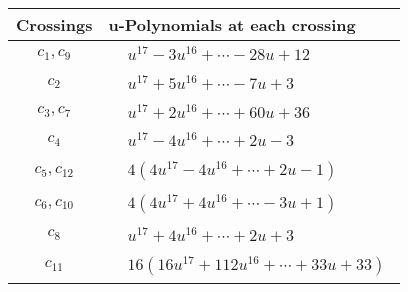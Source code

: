 \documentclass[1p]{elsarticle_modified}
\theoremstyle{definition}
\begin{document}
\begin{tabular}{m{50pt}|m{274pt}}
Crossings & \hspace{64pt}u-Polynomials at each crossing \\
\hline $$\begin{aligned}c_{1},c_{9}\end{aligned}$$&$\begin{aligned}
&u^{17}-3 u^{16}+\cdots-28 u+12
\end{aligned}$\\
\hline $$\begin{aligned}c_{2}\end{aligned}$$&$\begin{aligned}
&u^{17}+5 u^{16}+\cdots-7 u+3
\end{aligned}$\\
\hline $$\begin{aligned}c_{3},c_{7}\end{aligned}$$&$\begin{aligned}
&u^{17}+2 u^{16}+\cdots+60 u+36
\end{aligned}$\\
\hline $$\begin{aligned}c_{4}\end{aligned}$$&$\begin{aligned}
&u^{17}-4 u^{16}+\cdots+2 u-3
\end{aligned}$\\
\hline $$\begin{aligned}c_{5},c_{12}\end{aligned}$$&$\begin{aligned}
&4(4 u^{17}-4 u^{16}+\cdots+2 u-1)
\end{aligned}$\\
\hline $$\begin{aligned}c_{6},c_{10}\end{aligned}$$&$\begin{aligned}
&4(4 u^{17}+4 u^{16}+\cdots-3 u+1)
\end{aligned}$\\
\hline $$\begin{aligned}c_{8}\end{aligned}$$&$\begin{aligned}
&u^{17}+4 u^{16}+\cdots+2 u+3
\end{aligned}$\\
\hline $$\begin{aligned}c_{11}\end{aligned}$$&$\begin{aligned}
&16(16 u^{17}+112 u^{16}+\cdots+33 u+33)
\end{aligned}$\\
\hline
\end{tabular}\\~\\
\end{document}

